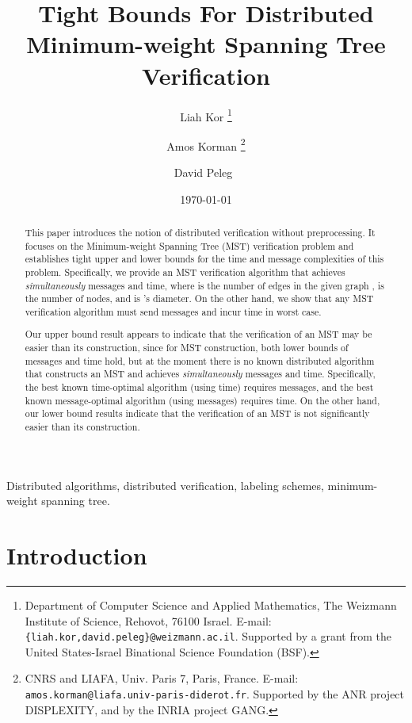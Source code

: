 \documentclass[11pt,letter]{article}
\title{{\bf\Large Tight Bounds For Distributed Minimum-weight Spanning Tree
Verification}}
\date{\today}
\author{
Liah Kor
\thanks{Department of Computer Science and Applied Mathematics, The Weizmann
Institute of Science, Rehovot, 76100 Israel. 
E-mail: {\tt \{liah.kor,david.peleg\}@weizmann.ac.il}.
Supported by a grant from the United States-Israel Binational Science 
Foundation (BSF).}
\and
Amos Korman
\thanks{CNRS and LIAFA, Univ. Paris 7, Paris, France. 
E-mail: {\tt amos.korman@liafa.univ-paris-diderot.fr}. 
Supported by the ANR project DISPLEXITY, 
and by the INRIA project GANG.}
\and 
David Peleg~
}
\date{}
\begin{document}
\maketitle

\begin{abstract}
This paper introduces the notion of distributed verification without 
preprocessing. It focuses on the Minimum-weight Spanning Tree (MST) 
verification problem and establishes tight upper and lower bounds for 
the time and message complexities of this problem. Specifically, we
provide an MST verification algorithm that achieves {\em simultaneously} 
 messages and  time, where  is 
the number of edges in the given graph ,  is the number of nodes, 
and  is 's diameter. On the other hand, we show that any MST 
verification algorithm must send  messages and incur 
 time in worst case.

Our upper bound result appears to indicate that the verification of an MST may be easier than 
its construction, since for MST construction, both lower bounds of
 messages and  time hold, but at the moment 
there is no known distributed algorithm that constructs an MST and  achieves 
{\em simultaneously}  messages and  time.
Specifically, the best known time-optimal algorithm (using  
time) requires  messages, and the best known message-optimal 
algorithm (using  messages) requires  time.
On the other hand, our lower bound results indicate that the verification of an MST is not significantly easier than its construction.
\end{abstract}



 Distributed algorithms, distributed verification, labeling schemes, minimum-weight spanning tree.

\section {Introduction}
\end{document}
